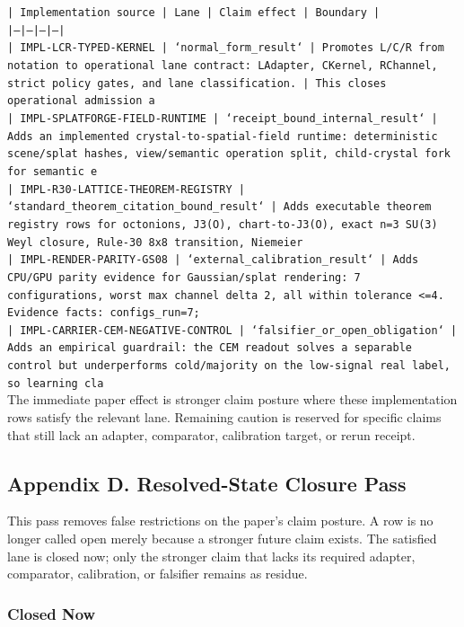 \documentclass[11pt]{article}
\begin{document}
\noindent\texttt{| Implementation source | Lane | Claim effect | Boundary |}\\
\noindent\texttt{|---|---|---|---|}\\
\noindent\texttt{| IMPL-LCR-TYPED-KERNEL | `normal\_form\_result` | Promotes L/C/R from notation to operational lane contract: LAdapter, CKernel, RChannel, strict policy gates, and lane classification. | This closes operational admission a}\\
\noindent\texttt{| IMPL-SPLATFORGE-FIELD-RUNTIME | `receipt\_bound\_internal\_result` | Adds an implemented crystal-to-spatial-field runtime: deterministic scene/splat hashes, view/semantic operation split, child-crystal fork for semantic e}\\
\noindent\texttt{| IMPL-R30-LATTICE-THEOREM-REGISTRY | `standard\_theorem\_citation\_bound\_result` | Adds executable theorem registry rows for octonions, J3(O), chart-to-J3(O), exact n=3 SU(3) Weyl closure, Rule-30 8x8 transition, Niemeier }\\
\noindent\texttt{| IMPL-RENDER-PARITY-GS08 | `external\_calibration\_result` | Adds CPU/GPU parity evidence for Gaussian/splat rendering: 7 configurations, worst max channel delta 2, all within tolerance <=4. Evidence facts: configs\_run=7;}\\
\noindent\texttt{| IMPL-CARRIER-CEM-NEGATIVE-CONTROL | `falsifier\_or\_open\_obligation` | Adds an empirical guardrail: the CEM readout solves a separable control but underperforms cold/majority on the low-signal real label, so learning cla}\\

The immediate paper effect is stronger claim posture where these implementation rows satisfy the relevant lane. Remaining caution is reserved for specific claims that still lack an adapter, comparator, calibration target, or rerun receipt.

\subsection*{Appendix D. Resolved-State Closure Pass}

This pass removes false restrictions on the paper's claim posture. A row is no longer called open merely because a stronger future claim exists. The satisfied lane is closed now; only the stronger claim that lacks its required adapter, comparator, calibration, or falsifier remains as residue.

\subsubsection*{Closed Now}
\end{document}
